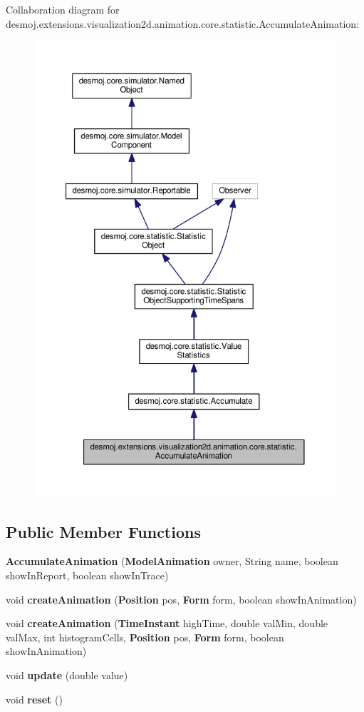 Collaboration diagram for desmoj.\-extensions.\-visualization2d.\-animation.\-core.\-statistic.\-Accumulate\-Animation\-:
\nopagebreak
\begin{figure}[H]
\begin{center}
\leavevmode
\includegraphics[width=350pt]{classdesmoj_1_1extensions_1_1visualization2d_1_1animation_1_1core_1_1statistic_1_1_accumulate_animation__coll__graph}
\end{center}
\end{figure}
\subsection*{Public Member Functions}
\begin{DoxyCompactItemize}
\item 
{\bf Accumulate\-Animation} ({\bf Model\-Animation} owner, String name, boolean show\-In\-Report, boolean show\-In\-Trace)
\item 
void {\bf create\-Animation} ({\bf Position} pos, {\bf Form} form, boolean show\-In\-Animation)
\item 
void {\bf create\-Animation} ({\bf Time\-Instant} high\-Time, double val\-Min, double val\-Max, int histogram\-Cells, {\bf Position} pos, {\bf Form} form, boolean show\-In\-Animation)
\item 
void {\bf update} (double value)
\item 
void {\bfseries reset} ()\label{classdesmoj_1_1extensions_1_1visualization2d_1_1animation_1_1core_1_1statistic_1_1_accumulate_animation_abd1cbec29d20099ed257221b2f462906}

\end{DoxyCompactItemize}
